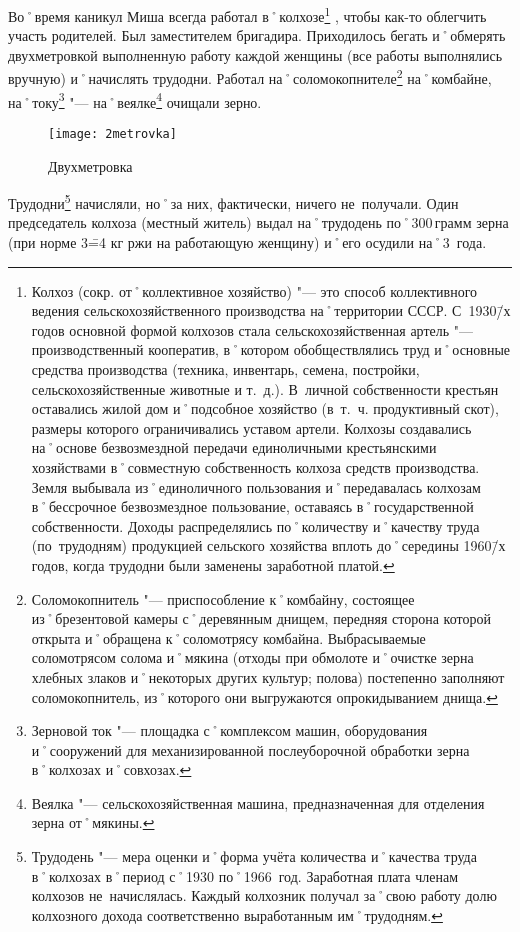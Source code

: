 Во˚время каникул Миша всегда работал в˚колхозе\footnote
{Колхоз (сокр. от˚коллективное хозяйство) "--- это способ коллективного ведения сельскохозяйственного производства на˚территории СССР. С~1930\=/х годов основной формой колхозов стала сельскохозяйственная артель "--- производственный кооператив, в˚котором обобществлялись труд и˚основные средства производства (техника, инвентарь, семена, постройки, сельскохозяйственные животные и т.~д.). В~личной собственности крестьян оставались жилой дом и˚подсобное хозяйство (в~т.~ч. продуктивный скот), размеры которого ограничивались уставом артели. Колхозы создавались на˚основе безвозмездной передачи единоличными крестьянскими хозяйствами в˚совместную собственность колхоза средств производства. Земля выбывала из˚единоличного пользования и˚передавалась колхозам в˚бессрочное безвозмездное пользование, оставаясь в˚государственной собственности. Доходы распределялись по˚количеству и˚качеству труда (по~трудодням) продукцией сельского хозяйства вплоть до˚середины 1960\=/х годов, когда трудодни были заменены заработной платой.}%
, чтобы как-то облегчить участь родителей. Был заместителем бригадира. Приходилось бегать и˚обмерять двухметровкой выполненную работу каждой женщины (все работы выполнялись вручную) и˚начислять трудодни. Работал на˚соломокопнителе\footnote
{Соломокопнитель "--- приспособление к˚комбайну, состоящее из˚брезентовой камеры с˚деревянным днищем, передняя сторона которой открыта и˚обращена к˚соломотрясу комбайна. Выбрасываемые соломотрясом солома и˚мякина (отходы при обмолоте и˚очистке зерна хлебных злаков и˚некоторых других культур; полова) постепенно заполняют соломокопнитель, из˚которого они выгружаются опрокидыванием днища.}
на˚комбайне, на˚току\footnote
{Зерновой ток "--- площадка с˚комплексом машин, оборудования и˚сооружений для механизированной послеуборочной обработки зерна в˚колхозах и˚совхозах.}
"--- на˚веялке\footnote
{Веялка "--- сельскохозяйственная машина, предназначенная для отделения зерна от˚мякины.} очищали зерно.

\begin{wrapfigure}{O}{.25\textwidth}
\centering
\texttt{[image: 2metrovka]}
\caption[Двухметровка]{Двухметровка\footnotemark}
\label{fig:2metrovka}
\end{wrapfigure}

Трудодни\footnote{Трудодень "--- мера оценки и˚форма учёта количества и˚качества труда в˚колхозах в˚период с˚1930 по˚1966~год. Заработная плата членам колхозов не~начислялась. Каждый колхозник получал за˚свою работу долю колхозного дохода соответственно выработанным им˚трудодням.} начисляли, но˚за них, фактически, ничего не~получали. Один председатель колхоза (местный житель) выдал на˚трудодень по˚300\,грамм зерна (при норме 3\==4 кг ржи на работающую женщину) и˚его осудили на˚3~года.

